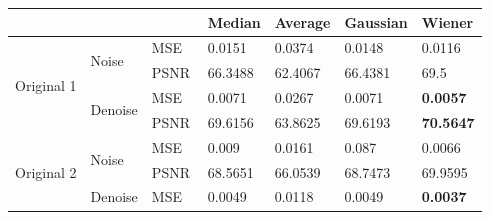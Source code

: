 \begin{center}
\begin{tabular}{llllllllllll|l|l|l|l|l|l|l|l|l|l|l|l|l|}
\cline{13-25}
           &            &            &            &            &            &          &          &       &      &      &     & \multicolumn{3}{l|}{Median}  & \multicolumn{3}{l|}{Average} & \multicolumn{4}{l|}{Gaussian} & \multicolumn{3}{l|}{Wiener}           \\ \hline
\multicolumn{4}{|l|}{\multirow{4}{*}{Original 1}} & \multicolumn{4}{l|}{\multirow{2}{*}{Noise}}   & \multicolumn{4}{l|}{MSE}  & \multicolumn{3}{l|}{0.0151}  & \multicolumn{3}{l|}{0.0374}  & \multicolumn{4}{l|}{0.0148}   & \multicolumn{3}{l|}{0.0116}           \\ \cline{9-25} 
\multicolumn{4}{|l|}{}                            & \multicolumn{4}{l|}{}                         & \multicolumn{4}{l|}{PSNR} & \multicolumn{3}{l|}{66.3488} & \multicolumn{3}{l|}{62.4067} & \multicolumn{4}{l|}{66.4381}  & \multicolumn{3}{l|}{69.5}             \\ \cline{5-25} 
\multicolumn{4}{|l|}{}                            & \multicolumn{4}{l|}{\multirow{2}{*}{Denoise}} & \multicolumn{4}{l|}{MSE}  & \multicolumn{3}{l|}{0.0071}  & \multicolumn{3}{l|}{0.0267}  & \multicolumn{4}{l|}{0.0071}   & \multicolumn{3}{l|}{\textbf{0.0057}}  \\ \cline{9-25} 
\multicolumn{4}{|l|}{}                            & \multicolumn{4}{l|}{}                         & \multicolumn{4}{l|}{PSNR} & \multicolumn{3}{l|}{69.6156} & \multicolumn{3}{l|}{63.8625} & \multicolumn{4}{l|}{69.6193}  & \multicolumn{3}{l|}{\textbf{70.5647}} \\ \hline
\multicolumn{4}{|l|}{\multirow{4}{*}{Original 2}} & \multicolumn{4}{l|}{\multirow{2}{*}{Noise}}   & \multicolumn{4}{l|}{MSE}  & \multicolumn{3}{l|}{0.009}   & \multicolumn{3}{l|}{0.0161}  & \multicolumn{4}{l|}{0.087}    & \multicolumn{3}{l|}{0.0066}           \\ \cline{9-25} 
\multicolumn{4}{|l|}{}                            & \multicolumn{4}{l|}{}                         & \multicolumn{4}{l|}{PSNR} & \multicolumn{3}{l|}{68.5651} & \multicolumn{3}{l|}{66.0539} & \multicolumn{4}{l|}{68.7473}  & \multicolumn{3}{l|}{69.9595}          \\ \cline{5-25} 
\multicolumn{4}{|l|}{}                            & \multicolumn{4}{l|}{\multirow{2}{*}{Denoise}} & \multicolumn{4}{l|}{MSE}  & \multicolumn{3}{l|}{0.0049}  & \multicolumn{3}{l|}{0.0118}  & \multicolumn{4}{l|}{0.0049}   & \multicolumn{3}{l|}{\textbf{0.0037}}  \\ \cline{9-25} 

\end{tabular}
\end{center}

